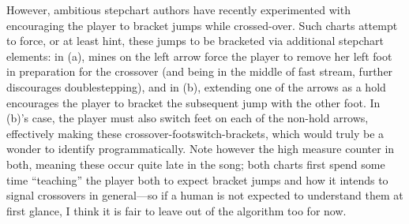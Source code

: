 \documentclass[10pt]{sigplanconf}
\begin{document}
However, ambitious stepchart authors have recently experimented with encouraging the player to bracket jumps while crossed-over.
Such charts attempt to force, or at least hint, these jumps to be bracketed
via additional stepchart elements: in (a), mines on the left arrow force the player to remove her left foot in preparation for the crossover (and being in the middle of fast stream, further discourages doublestepping),
and in (b), extending one of the arrows as a hold encourages the player to bracket the subsequent jump with the other foot.
In (b)'s case, the player must also switch feet on each of the non-hold arrows,
effectively making these crossover-footswitch-brackets,
which would truly be a wonder to identify programmatically.
Note however the high measure counter in both, meaning these occur quite late in the song;
both charts first spend some time ``teaching'' the player both to expect bracket jumps
and how it intends to signal crossovers in general---so if a human is not expected to understand them at first glance,
I think it is fair to leave out of the algorithm too for now.
\end{document}
